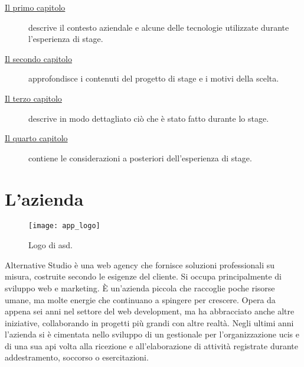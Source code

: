 \begin{description}

    \item[{\hyperref[cap:introduzione]{Il primo capitolo}}] descrive il contesto aziendale e alcune delle tecnologie utilizzate durante l'esperienza di stage.

    \item[{\hyperref[cap:descrizione-stage]{Il secondo capitolo}}] approfondisce i contenuti del progetto di stage e i motivi della scelta.

    \item[{\hyperref[cap:ilprogetto]{Il terzo capitolo}}] descrive in modo dettagliato ciò che è stato fatto durante lo stage.

    \item[{\hyperref[cap:valutazione-retrospettiva]{Il quarto capitolo}}] contiene le considerazioni a posteriori dell'esperienza di stage.

\end{description}


\section{L'azienda}

\begin{figure}[htbp]
	\begin{center}
		\texttt{[image: app\_logo]}
	\end{center}
	\caption {Logo di \acrlong{asd}.}
\end{figure}

Alternative Studio è una web agency che fornisce soluzioni professionali su misura, costruite secondo le esigenze del cliente. Si occupa
principalmente di sviluppo web e marketing. È un'azienda piccola che raccoglie poche risorse umane, ma molte energie che continuano a
spingere per crescere. Opera da appena sei anni nel settore del web development, ma ha abbracciato anche altre iniziative, collaborando in
progetti più grandi con altre realtà. Negli ultimi anni l'azienda si è cimentata nello sviluppo di un gestionale per l'organizzazione
\gls{ucis} e di una sua \acrshort{api} volta alla ricezione e all'elaborazione di attività registrate durante addestramento,
soccorso o esercitazioni.

